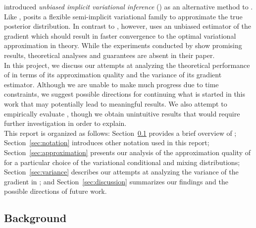 \documentclass[10pt]{article}
\begin{document}
\citet{Titsias:2019} introduced \textit{unbiased implicit variational inference} (\uivi) as an alternative method to \sivi. Like \sivi, \uivi posits a flexible semi-implicit variational family to approximate the true posterior distribution. In contrast to \sivi, however, \uivi uses an unbiased estimator of the \elbo gradient which should result in faster convergence to the optimal variational approximation in theory. While the experiments conducted by \citet{Titsias:2019} show promising results, theoretical analyses and guarantees are absent in their paper.
\\

In this project, we discuss our attempts at analyzing the theoretical performance of \uivi in terms of its approximation quality and the variance of its \elbo gradient estimator. Although we are unable to make much progress due to time constraints, we suggest possible directions for continuing what is started in this work that may potentially lead to meaningful results. We also attempt to empirically evaluate \uivi, though we obtain unintuitive results that would require further investigation in order to explain.
\\

This report is organized as follows: Section~\ref{sec:background} provides a brief overview of \uivi; Section~\ref{sec:notation} introduces other notation used in this report; Section~\ref{sec:approximation} presents our analysis of the approximation quality of \uivi for a particular choice of the variational conditional and mixing distributions; Section~\ref{sec:variance} describes our attempts at analyzing the variance of the \elbo gradient in \uivi; and Section~\ref{sec:discussion} summarizes our findings and the possible directions of future work.


\subsection{Background} \label{sec:background}
\end{document}
